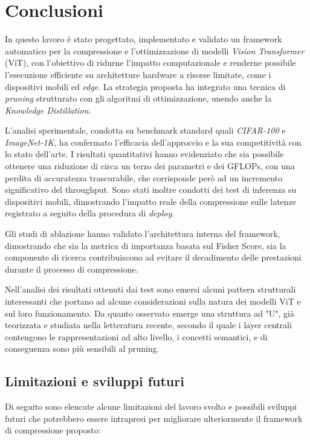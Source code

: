 \chapter*{Conclusioni}

In questo lavoro è stato progettato, implementato e validato un framework automatico per la compressione e l'ottimizzazione di modelli \textit{Vision Transformer} (ViT), con l'obiettivo di ridurne l'impatto computazionale e renderne possibile l'esecuzione efficiente su architetture hardware a risorse limitate, come i dispositivi mobili ed \textit{edge}. La strategia proposta ha integrato una tecnica di \textit{pruning} strutturato con gli algoritmi di ottimizzazione, unendo anche la \textit{Knowledge Distillation}. \par

L'analisi sperimentale, condotta su benchmark standard quali \textit{CIFAR-100} e \textit{ImageNet-1K}, ha confermato l'efficacia dell'approccio e la sua competitività con lo stato dell'arte. I risultati quantitativi hanno evidenziato che sia possibile ottenere una riduzione di circa un terzo dei parametri e dei GFLOPs, con una perdita di accuratezza trascurabile, che corrisponde però ad un incremento significativo del throughput. Sono stati inoltre condotti dei test di inferenza su dispositivi mobili, dimostrando l'impatto reale della compressione sulle latenze registrato a seguito della procedura di \textit{deploy}. \par

Gli studi di ablazione hanno validato l'architettura interna del framework, dimostrando che sia la metrica di importanza basata sul Fisher Score, sia la componente di ricerca contribuiscono ad evitare il decadimento delle prestazioni durante il processo di compressione. \par

Nell'analisi dei risultati ottenuti dai test sono emersi alcuni pattern strutturali interessanti che portano ad alcune considerazioni sulla natura dei modelli ViT e sul loro funzionamento. Da quanto osservato emerge una struttura ad "U", già teorizzata e studiata nella letteratura recente, secondo il quale i layer centrali contengono le rappresentazioni ad alto livello, i concetti semantici, e di conseguenza sono più sensibili al pruning. 


\section{Limitazioni e sviluppi futuri}
Di seguito sono elencate alcune limitazioni del lavoro svolto e possibili sviluppi futuri che potrebbero essere intrapresi per migliorare ulteriormente il framework di compressione proposto:


